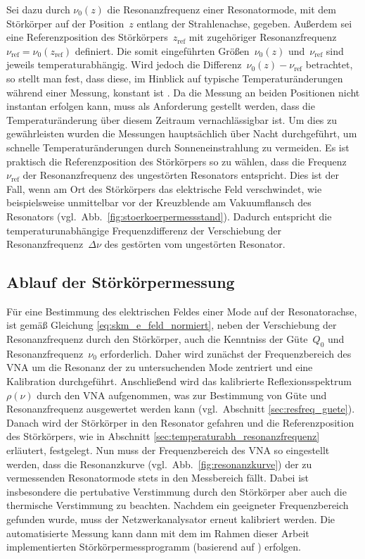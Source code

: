 Sei dazu durch $\nu_0(z)$ die Resonanzfrequenz einer Resonatormode, mit dem Störkörper auf der Position~$z$ entlang der Strahlenachse, gegeben.
Außerdem sei eine Referenzposition des Störkörpers~$z_\mathrm{ref}$ mit zugehöriger Resonanzfrequenz~$\nu_\mathrm{ref} = \nu_0(z_\mathrm{ref})$ definiert.
Die somit eingeführten Größen~$\nu_0(z)$ und~$\nu_\mathrm{ref}$ sind jeweils temperaturabhängig.
Wird jedoch die Differenz~$\nu_0(z) - \nu_\mathrm{ref}$ betrachtet, so stellt man fest, dass diese, im Hinblick auf typische Temperaturänderungen während einer Messung, konstant ist \cite{schedler_pm}.
Da die Messung an beiden Positionen nicht instantan erfolgen kann, muss als Anforderung gestellt werden, dass die Temperaturänderung über diesem Zeitraum vernachlässigbar ist.
Um dies zu gewährleisten wurden die Messungen hauptsächlich über Nacht durchgeführt, um schnelle Temperaturänderungen durch Sonneneinstrahlung zu vermeiden.
Es ist praktisch die Referenzposition des Störkörpers so zu wählen, dass die Frequenz~$\nu_\mathrm{ref}$ der Resonanzfrequenz des ungestörten Resonators entspricht.
Dies ist der Fall, wenn am Ort des Störkörpers das elektrische Feld verschwindet, wie beispielsweise unmittelbar vor der Kreuzblende am Vakuumflansch des Resonators (vgl.\ Abb.\ \ref{fig:stoerkoerpermessstand}).
Dadurch entspricht die temperaturunabhängige Frequenzdifferenz der Verschiebung der Resonanzfrequenz~$\Delta \nu$ des gestörten vom ungestörten Resonator.


\subsection{Ablauf der Störkörpermessung}
Für eine Bestimmung des elektrischen Feldes einer Mode auf der Resonatorachse, ist gemäß Gleichung \eqref{eq:skm_e_feld_normiert}, neben der Verschiebung der Resonanzfrequenz durch den Störkörper, auch die Kenntniss der Güte~$Q_0$ und Resonanzfrequenz~$\nu_0$ erforderlich.
Daher wird zunächst der Frequenzbereich des VNA um die Resonanz der zu untersuchenden Mode zentriert und eine Kalibration durchgeführt.
Anschließend wird das kalibrierte Reflexionsspektrum $\rho(\nu)$ durch den VNA aufgenommen, was zur Bestimmung von Güte und Resonanzfrequenz ausgewertet werden kann (vgl.\ Abschnitt \ref{sec:resfreq_guete}).
Danach wird der Störkörper in den Resonator gefahren und die Referenzposition des Störkörpers, wie in Abschnitt \ref{sec:temperaturabh_resonanzfrequenz} erläutert, festgelegt.
Nun muss der Frequenzbereich des VNA so eingestellt werden, dass die Resonanzkurve (vgl.\ Abb.\ \ref{fig:resonanzkurve}) der zu vermessenden Resonatormode stets in den Messbereich fällt.
Dabei ist insbesondere die pertubative Verstimmung durch den Störkörper aber auch die thermische Verstimmung zu beachten.
Nachdem ein geeigneter Frequenzbereich gefunden wurde, muss der Netzwerkanalysator erneut kalibriert werden.
Die automatisierte Messung kann dann mit dem im Rahmen dieser Arbeit implementierten Störkörpermessprogramm (basierend auf \cite{schedler_prog}) erfolgen.

